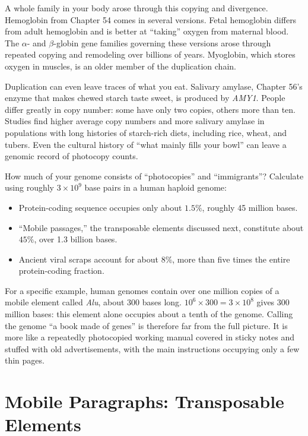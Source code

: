 A whole family in your body arose through this copying and divergence. Hemoglobin from Chapter 54 comes in several versions. Fetal hemoglobin differs from adult hemoglobin and is better at ``taking'' oxygen from maternal blood. The $\alpha$- and $\beta$-globin gene families governing these versions arose through repeated copying and remodeling over billions of years. Myoglobin, which stores oxygen in muscles, is an older member of the duplication chain.

Duplication can even leave traces of what you eat. Salivary amylase, Chapter 56's enzyme that makes chewed starch taste sweet, is produced by \emph{AMY1}. People differ greatly in copy number: some have only two copies, others more than ten. Studies find higher average copy numbers and more salivary amylase in populations with long histories of starch-rich diets, including rice, wheat, and tubers. Even the cultural history of ``what mainly fills your bowl'' can leave a genomic record of photocopy counts.

\begin{qiaoliang}
How much of your genome consists of ``photocopies'' and ``immigrants''? Calculate using roughly $3\times 10^{9}$ base pairs in a human haploid genome:

\begin{itemize}[itemsep=2pt]
\item Protein-coding sequence occupies only about $1.5\%$, roughly 45 million bases.
\item ``Mobile passages,'' the transposable elements discussed next, constitute about $45\%$, over 1.3 billion bases.
\item Ancient viral scraps account for about $8\%$, more than five times the entire protein-coding fraction.
\end{itemize}

For a specific example, human genomes contain over one million copies of a mobile element called \emph{Alu}, about 300 bases long. $10^{6}\times 300=3\times 10^{8}$ gives 300 million bases: this element alone occupies about a tenth of the genome. Calling the genome ``a book made of genes'' is therefore far from the full picture. It is more like a repeatedly photocopied working manual covered in sticky notes and stuffed with old advertisements, with the main instructions occupying only a few thin pages.
\end{qiaoliang}

\section{Mobile Paragraphs: Transposable Elements}

